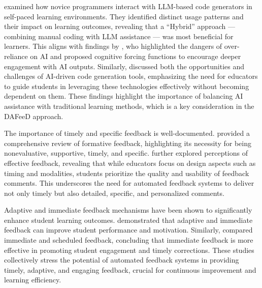 \documentclass[sigconf,screen,review,anonymous]{acmart}
\begin{document}
%
%
\citet{kazemitabaar:2024:HowNovicesUse} examined how novice programmers interact with LLM-based code generators in self-paced learning environments. 
They identified distinct usage patterns and their impact on learning outcomes, revealing that a ``Hybrid'' approach — combining manual coding with LLM assistance — was most beneficial for learners. 
This aligns with findings by \citet{bucinca:2021:TrustThinkCognitive}, who highlighted the dangers of over-reliance on AI and proposed cognitive forcing functions to encourage deeper engagement with AI outputs. 
Similarly, \citet{becker:2023:ProgrammingHardLeast} discussed both the opportunities and challenges of AI-driven code generation tools, emphasizing the need for educators to guide students in leveraging these technologies effectively without becoming dependent on them. 
These findings highlight the importance of balancing AI assistance with traditional learning methods, which is a key consideration in the DAFeeD approach.


%
The importance of timely and specific feedback is well-documented.
\citet{shute:2008:FocusFormativeFeedback} provided a comprehensive review of formative feedback, highlighting its necessity for being nonevaluative, supportive, timely, and specific.
\citet{dawson:2019:WhatMakesEffective} further explored perceptions of effective feedback, revealing that while educators focus on design aspects such as timing and modalities, students prioritize the quality and usability of feedback comments.
This underscores the need for automated feedback systems to deliver not only timely but also detailed, specific, and personalized comments.


%
Adaptive and immediate feedback mechanisms have been shown to significantly enhance student learning outcomes.
\citet{marwan:2020:AdaptiveImmediateFeedback} demonstrated that adaptive and immediate feedback can improve student performance and motivation.
Similarly, \citet{leinonen:2022:ComparisonImmediateScheduled} compared immediate and scheduled feedback, concluding that immediate feedback is more effective in promoting student engagement and timely corrections.
These studies collectively stress the potential of automated feedback systems in providing timely, adaptive, and engaging feedback, crucial for continuous improvement and learning efficiency.
\end{document}
